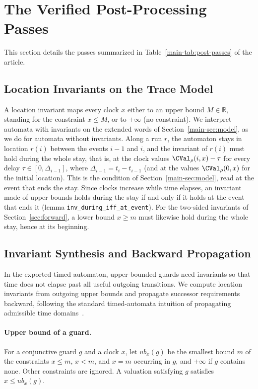 ﻿\section{The Verified Post-Processing Passes}
\label{sec:supp-passes}
This section details the passes summarized in Table~\ref{main-tab:post-passes} of
the article.

\subsection{Location Invariants on the Trace Model}
\label{sec:inv-semantics}
A location invariant maps every clock $x$ either to an upper bound
$M\in\mathbb R$, standing for the constraint $x\le M$, or to $+\infty$ (no
constraint).  We interpret automata with invariants on the extended words of
Section~\ref{main-sec:model}, as we do for automata without invariants.
Along a run $r$, the automaton stays in location $r(i)$ between the events
$i-1$ and $i$, and the invariant of $r(i)$ must hold during the whole stay,
that is, at the clock values $\CVal_\rho(i,x)-\tau$ for every delay
$\tau\in[0,\Delta_{i-1}]$, where $\Delta_{i-1}=t_i-t_{i-1}$ (and at the values $\CVal_\rho(0,x)$ for the
initial location).  This is the condition of Section~\ref{main-sec:model}, read at
the event that ends the stay.  Since clocks increase while time elapses, an
invariant made of upper bounds holds during the stay if and only if it holds at
the event that ends it (lemma \texttt{inv\_\allowbreak{}during\_\allowbreak{}iff\_\allowbreak{}at\_\allowbreak{}event}).
For the two-sided invariants of Section~\ref{sec:forward}, a lower bound
$x\ge m$ must likewise hold during the whole stay, hence at its beginning.

\subsection{Invariant Synthesis and Backward Propagation}
\label{sec:uppaal-invariants}
In the exported timed automaton, upper-bounded guards need invariants so that
time does not elapse past all useful outgoing transitions.  We compute location
invariants from outgoing upper bounds and propagate successor requirements
backward, following the standard timed-automata intuition of propagating
admissible time domains~\cite{[BGD04]}.

\paragraph{Upper bound of a guard.}
For a conjunctive guard $g$ and a clock $x$, let $\mathit{ub}_x(g)$ be the
smallest bound $m$ of the constraints $x\le m$, $x<m$, and $x=m$ occurring in
$g$, and $+\infty$ if $g$ contains none.  Other constraints are ignored.  A
valuation satisfying $g$ satisfies $x\le\mathit{ub}_x(g)$.

